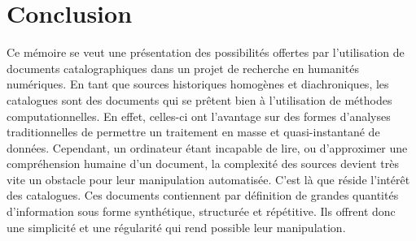 
\chapter*{Conclusion}
Ce mémoire se veut une présentation des possibilités offertes par l'utilisation de documents catalographiques dans un projet de recherche en humanités numériques. En tant que sources historiques homogènes et diachroniques, les catalogues sont des documents qui se prêtent bien à l'utilisation de méthodes computationnelles. En effet, celles-ci ont l'avantage sur des formes d'analyses traditionnelles de permettre un traitement en masse et quasi-instantané de données. Cependant, un ordinateur étant incapable de lire, ou d'approximer une compréhension humaine d'un document, la complexité des sources devient très vite un obstacle pour leur manipulation automatisée. C'est là que réside l'intérêt des catalogues. Ces documents contiennent par définition de grandes quantités d'information sous forme synthétique, structurée et répétitive. Ils offrent donc une simplicité et une régularité qui rend possible leur manipulation.

